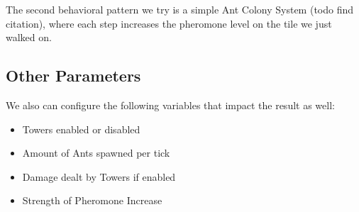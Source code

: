 The second behavioral pattern we try is a simple Ant Colony System (todo find citation), where each step increases the pheromone level on the tile we just walked on.

\subsection{Other Parameters}
We also can configure the following variables that impact the result as well:
\begin{itemize}
\item Towers enabled or disabled
\item Amount of Ants spawned per tick
\item Damage dealt by Towers if enabled
\item Strength of Pheromone Increase
\end{itemize}